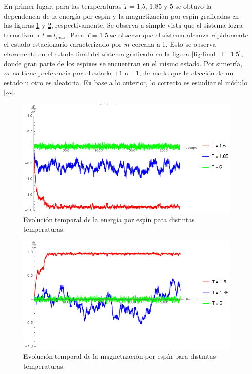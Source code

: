 \documentclass[aps,prb,twocolumn,superscriptaddress,floatfix,longbibliography]{revtex4-2}
\newcounter{para}
\begin{document}
En primer lugar, para las temperaturas $T = 1.5$, $1.85$ y $5$ se obtuvo la dependencia de la energía por espín y la magnetización por espín graficadas en las figuras \ref{fig:energia_vs_t.png} y \ref{fig:mag_vs_t.png}, respectivamente. Se observa a simple vista que el sistema logra termalizar a $t = t_{max}$. Para $T=1.5$ se observa que el sistema alcanza rápidamente el estado estacionario caracterizado por $m$ cercana a 1. Esto se observa claramente en el estado final del sistema graficado en la figura \ref{fig:final_T_1.5}, donde gran parte de los espines se encuentran en el mismo estado. Por simetría, $m$ no tiene preferencia por el estado $+1$ o $-1$, de modo que la elección de un estado u otro es aleatoria. En base a lo anterior, lo correcto es estudiar el módulo $|m|$.

\begin{figure}[h]
    \includegraphics[clip=true,width=\columnwidth]{energia_vs_t.png}
    \caption{Evolución temporal de la energía por espín para distintas temperaturas.}
     \label{fig:energia_vs_t.png}
\end{figure}

\begin{figure}[h]
    \includegraphics[clip=true,width=\columnwidth]{mag_vs_t.png}
    \caption{Evolución temporal de la magnetización por espín para distintas temperaturas.}
     \label{fig:mag_vs_t.png}
\end{figure}
\end{document}
